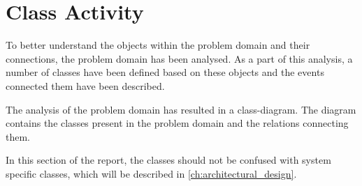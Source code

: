 \section{Class Activity} \label{sc:classes}
To better understand the objects within the problem domain and their connections, the problem domain has been analysed. As a part of this analysis, a number of classes have been defined based on these objects and the events connected them have been described.
\par

The analysis of the problem domain has resulted in a class-diagram. The diagram contains the classes present in the problem domain and the relations connecting them.
\par



In this section of the report, the classes should not be confused with system specific classes, which will be described in \autoref{ch:architectural_design}.
